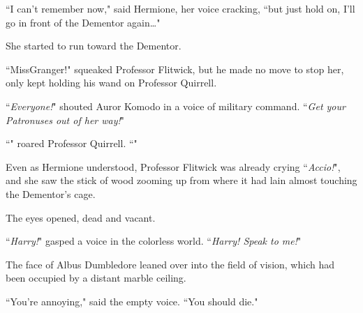 ``I can't remember now," said Hermione, her voice cracking, ``but just hold on, I'll go in front of the Dementor again{\ldots}"

She started to run toward the Dementor.

``Miss\?Granger!" squeaked Professor Flitwick, but he made no move to stop her, only kept holding his wand on Professor Quirrell.

``\emph{Everyone!}" shouted Auror Komodo in a voice of military command. ``\emph{Get your Patronuses out of her way!}"

``" roared Professor Quirrell. ``"

Even as Hermione understood, Professor Flitwick was already crying ``\emph{Accio!}", and she saw the stick of wood zooming up from where it had lain almost touching the Dementor's cage.

\later

The eyes opened, dead and vacant.

``\emph{Harry!}" gasped a voice in the colorless world. ``\emph{Harry! Speak to me!}"

The face of Albus Dumbledore leaned over into the field of vision, which had been occupied by a distant marble ceiling.

``You're annoying," said the empty voice. ``You should die."

